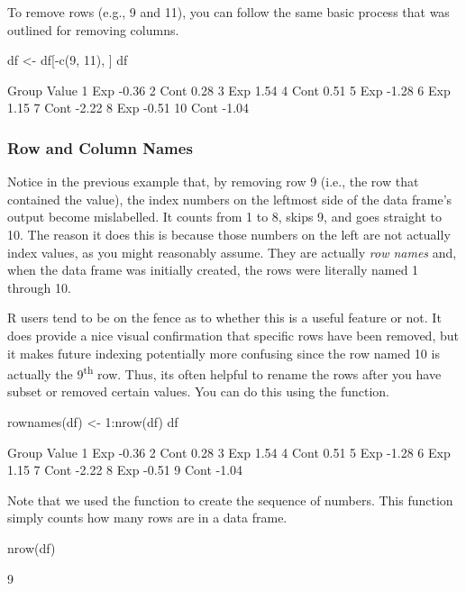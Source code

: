 To remove rows (e.g., 9 and 11), you can follow the same basic process that was outlined for removing columns.

\begin{inR}
df <- df[-c(9, 11), ]
df
\end{inR}
\begin{outR}
   Group Value
1    Exp -0.36
2   Cont  0.28
3    Exp  1.54
4   Cont  0.51
5    Exp -1.28
6    Exp  1.15
7   Cont -2.22
8    Exp -0.51
10  Cont -1.04
\end{outR}

\subsubsection{Row and Column Names}

Notice in the previous example that, by removing row 9 (i.e., the row that contained the  value), the index numbers on the leftmost side of the data frame's output become mislabelled. It counts from 1 to 8, skips 9, and goes straight to 10. The reason it does this is because those numbers on the left are not actually index values, as you might reasonably assume. They are actually \textit{row names} and, when the data frame was initially created, the rows were literally named 1 through 10.  

R users tend to be on the fence as to whether this is a useful feature or not.  It does provide a nice visual confirmation that specific rows have been removed, but it makes future indexing potentially more confusing since the row named 10 is actually the 9\textsuperscript{th} row.  Thus, its often helpful to rename the rows after you have subset or removed certain values. You can do this using the  function.

\begin{inR}
rownames(df) <- 1:nrow(df)
df
\end{inR}
\begin{outR}
  Group Value
1   Exp -0.36
2  Cont  0.28
3   Exp  1.54
4  Cont  0.51
5   Exp -1.28
6   Exp  1.15
7  Cont -2.22
8   Exp -0.51
9  Cont -1.04
\end{outR}

Note that we used the function  to create the sequence of numbers. This function simply counts how many rows are in a data frame.

\begin{inR}
nrow(df)
\end{inR}
\begin{outR}
[1] 9
\end{outR}

